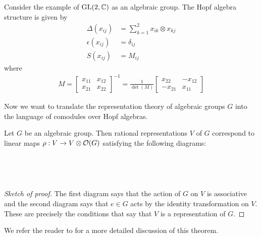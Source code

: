 \documentclass[12pt]{article}
\begin{document}
\begin{example}
    Consider the example of $\operatorname{GL}(2,\mathbb{C})$ as an algebraic group. The Hopf algebra structure is given by
    \begin{align*}
        \Delta(x_{ij}) &= \sum_{k=1}^2 x_{ik}\otimes x_{kj} \\
        \epsilon(x_{ij}) &= \delta_{ij} \\
        S(x_{ij}) &= M_{ij}
    \end{align*} where \begin{align*}
        M = \begin{bmatrix}
            x_{11} & x_{12} \\
            x_{21} & x_{22}
        \end{bmatrix}^{-1} = \frac{1}{\det(M)}\begin{bmatrix}
            x_{22} & -x_{12} \\
            -x_{21} & x_{11}
        \end{bmatrix}
    \end{align*}
\end{example}

\hfill

Now we want to translate the representation theory of algebraic groups $G$ into the language of comodules over Hopf algebras.
\begin{theorem}
    Let $G$ be an algebraic group. Then rational representations $V$ of $G$ 
    correspond to linear maps $\rho: V\to V\otimes \mathcal{O}(G)$ satisfying the following diagrams:
    \begin{center}
         \\

         \\
    \end{center}
\end{theorem}
\begin{proof}
    [Sketch of proof] The first diagram says that the action of $G$ on $V$ is associative 
    and the second diagram says that $e\in G$ acts by the identity transformation on $V$. 
    These are precisely the conditions that say that $V$ is a representation of $G$.
\end{proof}
We refer the reader to \cite{waterhouse} for a more detailed discussion of this theorem.
\end{document}
